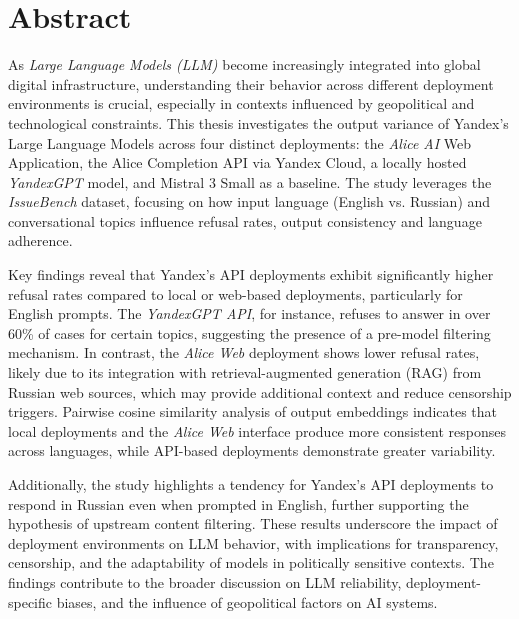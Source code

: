 \chapter*{Abstract}

As \textit{Large Language Models (LLM)} become increasingly integrated into global digital infrastructure, understanding their behavior across different deployment environments is crucial, especially in contexts influenced by geopolitical and technological constraints. This thesis investigates the output variance of Yandex’s Large Language Models across four distinct deployments: the \textit{Alice AI} Web Application, the Alice Completion API via Yandex Cloud, a locally hosted \textit{YandexGPT} model, and Mistral 3 Small as a baseline. The study leverages the \textit{IssueBench} dataset, focusing on how input language (English vs. Russian) and conversational topics influence refusal rates, output consistency and language adherence.

Key findings reveal that Yandex’s API deployments exhibit significantly higher refusal rates compared to local or web-based deployments, particularly for English prompts. The \textit{YandexGPT API}, for instance, refuses to answer in over 60\% of cases for certain topics, suggesting the presence of a pre-model filtering mechanism. In contrast, the \textit{Alice Web} deployment shows lower refusal rates, likely due to its integration with retrieval-augmented generation (RAG) from Russian web sources, which may provide additional context and reduce censorship triggers. Pairwise cosine similarity analysis of output embeddings indicates that local deployments and the \textit{Alice Web} interface produce more consistent responses across languages, while API-based deployments demonstrate greater variability.

Additionally, the study highlights a tendency for Yandex’s API deployments to respond in Russian even when prompted in English, further supporting the hypothesis of upstream content filtering. These results underscore the impact of deployment environments on LLM behavior, with implications for transparency, censorship, and the adaptability of models in politically sensitive contexts. The findings contribute to the broader discussion on LLM reliability, deployment-specific biases, and the influence of geopolitical factors on AI systems.